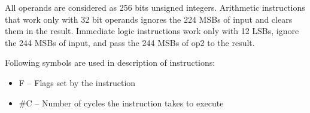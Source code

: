 \documentclass[notconfidential]{tropic_design_spec}
\begin{document}

All operands are considered as 256 bits unsigned integers. Arithmetic instructions that work only with 32 bit
operands ignores the 224 MSBs of input and clears them in the result. Immediate logic instructions work only
with 12 LSBs, ignore the 244 MSBs of input, and pass the 244 MSBs of op2 to the result.





Following symbols are used in description of instructions:
\begin{itemize}
    \item{F -- Flags set by the instruction}
    \item{\#C -- Number of cycles the instruction takes to execute}
\end{itemize}
\end{document}
